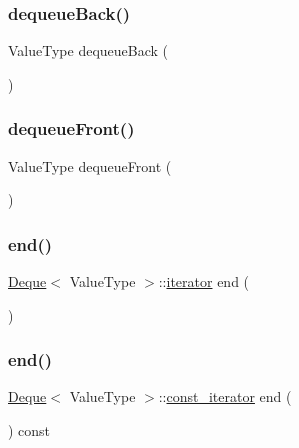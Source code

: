 \mbox{\label{classDeque_a0f7233390ba171bc0897e5f9618ac4a6}} 
\subsubsection{\texorpdfstring{dequeue\+Back()}{dequeueBack()}}
{\footnotesize\ttfamily Value\+Type dequeue\+Back (\begin{DoxyParamCaption}{ }\end{DoxyParamCaption})}

\mbox{\label{classDeque_aecf002fe82a60407f6008f6fd7ac2c27}} 
\subsubsection{\texorpdfstring{dequeue\+Front()}{dequeueFront()}}
{\footnotesize\ttfamily Value\+Type dequeue\+Front (\begin{DoxyParamCaption}{ }\end{DoxyParamCaption})}

\mbox{\label{classDeque_a3e0273054479ffdb04674903752630a0}} 
\subsubsection{\texorpdfstring{end()}{end()}\hspace{0.1cm}{\footnotesize\ttfamily [1/2]}}
{\footnotesize\ttfamily \mbox{\hyperlink{classDeque}{Deque}}$<$ Value\+Type $>$\+::\mbox{\hyperlink{classDeque_af87a5290666b1bb4bf3e44cafc305ad5}{iterator}} end (\begin{DoxyParamCaption}{ }\end{DoxyParamCaption})}

\mbox{\label{classDeque_a9224b9d5e9b60b47509ac51e8a0fc735}} 
\subsubsection{\texorpdfstring{end()}{end()}\hspace{0.1cm}{\footnotesize\ttfamily [2/2]}}
{\footnotesize\ttfamily \mbox{\hyperlink{classDeque}{Deque}}$<$ Value\+Type $>$\+::\mbox{\hyperlink{classDeque_a82e5b35971ca4096ad8c03687e86f11f}{const\+\_\+iterator}} end (\begin{DoxyParamCaption}{ }\end{DoxyParamCaption}) const}

